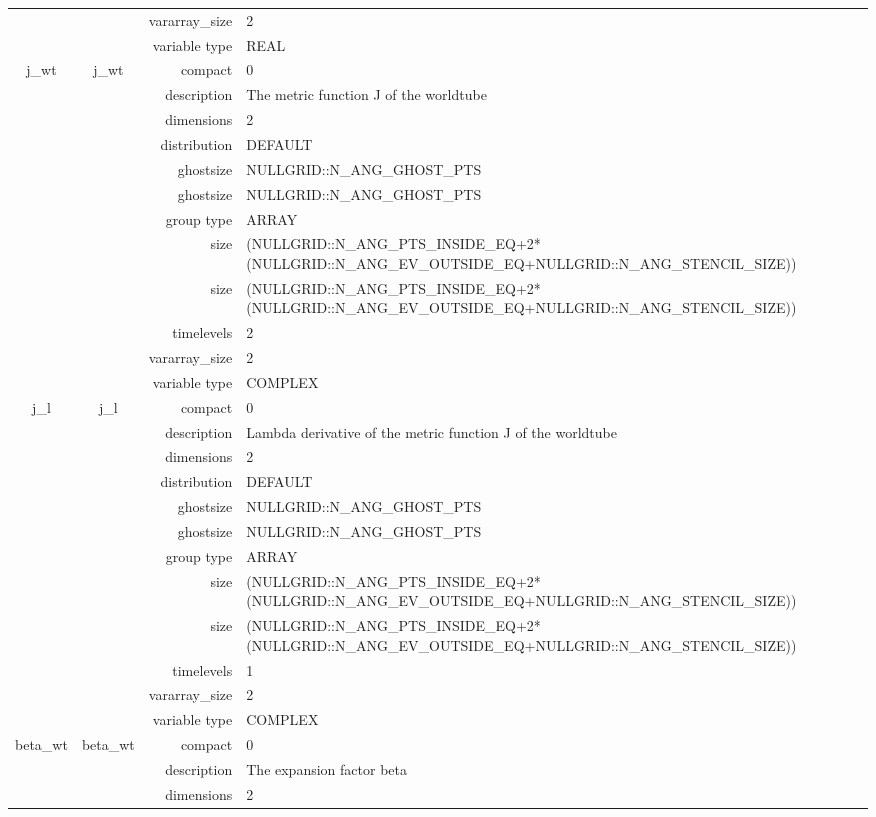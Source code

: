 \begin{tabular*}{150mm}{|c|c@{\extracolsep{\fill}}|rl|}
 &  & vararray\_size & 2 \\ 
 &  & variable type & REAL \\ 
\hline 
j\_wt & j\_wt & compact & 0 \\ 
 &  & description & The metric function J of the worldtube \\ 
 &  & dimensions & 2 \\ 
 &  & distribution & DEFAULT \\ 
 &  & ghostsize & NULLGRID::N\_ANG\_GHOST\_PTS \\ 
& ~ & ghostsize & NULLGRID::N\_ANG\_GHOST\_PTS \\ 
 &  & group type & ARRAY \\ 
 &  & size & (NULLGRID::N\_ANG\_PTS\_INSIDE\_EQ+2*(NULLGRID::N\_ANG\_EV\_OUTSIDE\_EQ+NULLGRID::N\_ANG\_STENCIL\_SIZE)) \\ 
& ~ & size & (NULLGRID::N\_ANG\_PTS\_INSIDE\_EQ+2*(NULLGRID::N\_ANG\_EV\_OUTSIDE\_EQ+NULLGRID::N\_ANG\_STENCIL\_SIZE)) \\ 
 &  & timelevels & 2 \\ 
 &  & vararray\_size & 2 \\ 
 &  & variable type & COMPLEX \\ 
\hline 
j\_l & j\_l & compact & 0 \\ 
 &  & description & Lambda derivative of the metric function J of the worldtube \\ 
 &  & dimensions & 2 \\ 
 &  & distribution & DEFAULT \\ 
 &  & ghostsize & NULLGRID::N\_ANG\_GHOST\_PTS \\ 
& ~ & ghostsize & NULLGRID::N\_ANG\_GHOST\_PTS \\ 
 &  & group type & ARRAY \\ 
 &  & size & (NULLGRID::N\_ANG\_PTS\_INSIDE\_EQ+2*(NULLGRID::N\_ANG\_EV\_OUTSIDE\_EQ+NULLGRID::N\_ANG\_STENCIL\_SIZE)) \\ 
& ~ & size & (NULLGRID::N\_ANG\_PTS\_INSIDE\_EQ+2*(NULLGRID::N\_ANG\_EV\_OUTSIDE\_EQ+NULLGRID::N\_ANG\_STENCIL\_SIZE)) \\ 
 &  & timelevels & 1 \\ 
 &  & vararray\_size & 2 \\ 
 &  & variable type & COMPLEX \\ 
\hline 
beta\_wt & beta\_wt & compact & 0 \\ 
 &  & description & The expansion factor beta \\ 
 &  & dimensions & 2 \\ 

\end{tabular*}
